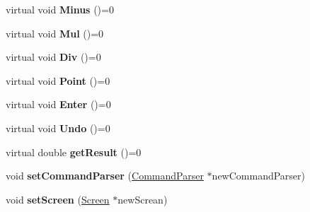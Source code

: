\begin{DoxyCompactItemize}
\item 
\hypertarget{class_calculator_a8a76dc6f06eb62fb6f38035d769f8389}{}virtual void {\bfseries Minus} ()=0\label{class_calculator_a8a76dc6f06eb62fb6f38035d769f8389}

\item 
\hypertarget{class_calculator_aa64cb3fd77df308c4d9026ca740bae54}{}virtual void {\bfseries Mul} ()=0\label{class_calculator_aa64cb3fd77df308c4d9026ca740bae54}

\item 
\hypertarget{class_calculator_aec54e6621a3751906015adcfcaadce44}{}virtual void {\bfseries Div} ()=0\label{class_calculator_aec54e6621a3751906015adcfcaadce44}

\item 
\hypertarget{class_calculator_ad0a655b502a7b7e095f00cd3eeeac492}{}virtual void {\bfseries Point} ()=0\label{class_calculator_ad0a655b502a7b7e095f00cd3eeeac492}

\item 
\hypertarget{class_calculator_a88ffe2fa664c53cfe32f4fe5b099360c}{}virtual void {\bfseries Enter} ()=0\label{class_calculator_a88ffe2fa664c53cfe32f4fe5b099360c}

\item 
\hypertarget{class_calculator_a40fad28cbf396f8bc6b479ee2a9ddf90}{}virtual void {\bfseries Undo} ()=0\label{class_calculator_a40fad28cbf396f8bc6b479ee2a9ddf90}

\item 
\hypertarget{class_calculator_a45ac4eb8a5cd868240d9fe37395b4727}{}virtual double {\bfseries get\+Result} ()=0\label{class_calculator_a45ac4eb8a5cd868240d9fe37395b4727}

\item 
\hypertarget{class_calculator_a2741fb1d13f4f12cbb3143a6f8f370ae}{}void {\bfseries set\+Command\+Parser} (\hyperlink{class_command_parser}{Command\+Parser} $\ast$new\+Command\+Parser)\label{class_calculator_a2741fb1d13f4f12cbb3143a6f8f370ae}

\item 
\hypertarget{class_calculator_acca1cf465771d79dc842b28a7575f23f}{}void {\bfseries set\+Screen} (\hyperlink{class_screen}{Screen} $\ast$new\+Screan)\label{class_calculator_acca1cf465771d79dc842b28a7575f23f}

\end{DoxyCompactItemize}
